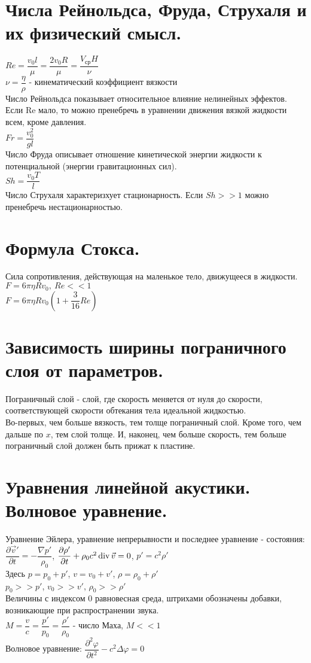 \begin{multicols*}{2}
		\section{Числа Рейнольдса, Фруда, Струхаля и их физический смысл.}
		$Re=\dfrac{v_0l}{\mu}=\dfrac{2v_0R}{\mu} = \dfrac{V_\text{ср}H}{\nu}$\\
		$\nu=\dfrac{\eta}{\rho}$ - кинематический коэффициент вязкости \\
		Число Рейнольдса показывает относительное влияние нелинейных эффектов. Если Re мало, то можно пренебречь в уравнении движения вязкой жидкости всем, кроме давления. \\
		$Fr=\dfrac{v_0^2}{gl}$ \\
		Число Фруда описывает отношение кинетической энергии жидкости к потенциальной (энергии гравитационных сил). \\
		$Sh=\dfrac{v_0T}{l}$ \\
		Число Струхаля характеризхует стационарность. Если $Sh >> 1$ можно пренебречь нестационарностью.
		
		\section{Формула Стокса.}
		Сила сопротивления, действующая на маленькое тело, движущееся в жидкости.\\
		$F=6\pi\eta Rv_0, ~Re << 1$ \\
		$F=6\pi\eta Rv_0\left(1+\dfrac{3}{16}Re\right)$
		
		\section{Зависимость ширины пограничного слоя от параметров.}
		Пограничный слой - слой, где скорость меняется от нуля до скорости, соответствующей скорости обтекания тела идеальной жидкостью.\\
		Во-первых, чем больше вязкость, тем толще пограничный слой. Кроме того, чем дальше по $x$, тем слой толще. И, наконец, чем больше скорость, тем больше пограничный слой должен быть прижат к пластине.
		
		\section{Уравнения линейной акустики. Волновое уравнение.}
		Уравнение Эйлера, уравнение непрерывности и последнее уравнение - состояния:\\
		$\dfrac{\partial \vec{v}'}{\partial t} = -\dfrac{\nabla p'}{\rho_0}$,	$\dfrac{\partial \rho'}{\partial t} + \rho_0 c^2 \operatorname{div} \vec{v} = 0$, 	$p' = c^2 \rho'$\\
		Здесь $p = p_0 + p'$, $v = v_0 + v'$, $\rho  = \rho_0 + \rho'$\\
		$p_0 >> p'$, $v_0 >> v'$, $\rho_0 >> \rho'$\\
		Величины с индексом 0 равновесная среда, штрихами обозначены добавки, возникающие при распространении звука.\\
		$M = \dfrac{v}{c} = \dfrac{p'}{p_0} = \dfrac{\rho'}{\rho_0}$ - число Маха, $M << 1$\\
		Волновое уравнение:
		$\dfrac{\partial^2 \varphi}{\partial t^2} - c^2 \Delta\varphi = 0$
		

\end{multicols*}
